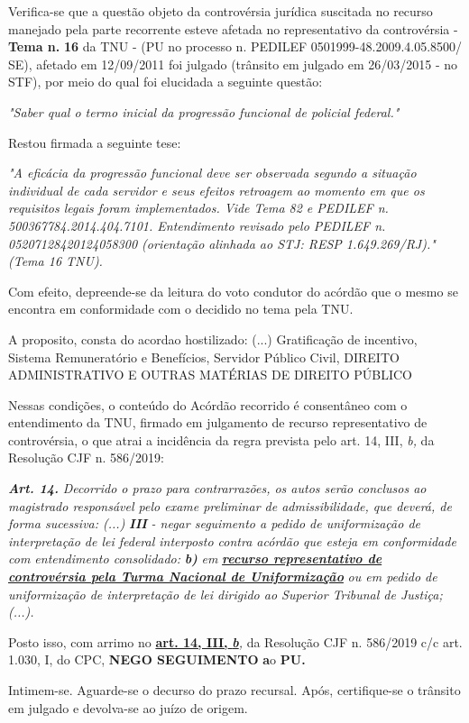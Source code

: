 \documentclass[12pt]{article}
\begin{document}
\justifying
\noindent Verifica-se que a questão objeto da controvérsia jurídica suscitada no recurso manejado pela parte recorrente esteve afetada no representativo da controvérsia - \textbf{Tema n. }\textbf{16} da TNU - (PU no processo n. PEDILEF 0501999-48.2009.4.05.8500/ SE),  afetado em 12/09/2011 foi julgado (trânsito em julgado em 26/03/2015 - no STF), por meio do qual foi elucidada a seguinte questão:

\noindent \textit{"Saber qual o termo inicial da progressão funcional de policial federal."}

\noindent Restou firmada a seguinte tese:

\noindent \textit{"A eficácia da progressão funcional deve ser observada segundo a situação individual de cada servidor e seus efeitos retroagem ao momento em que os requisitos legais foram implementados. Vide Tema 82 e PEDILEF n. 500367784.2014.404.7101. Entendimento revisado pelo PEDILEF n. 05207128420124058300 (orientação alinhada ao STJ: RESP 1.649.269/RJ)." (Tema 16 TNU).}

\noindent Com efeito, depreende-se da leitura do voto condutor do acórdão que o mesmo se encontra em conformidade com o decidido no  tema pela TNU.

\noindent A proposito, consta do acordao hostilizado: (...) Gratificação de incentivo, Sistema Remuneratório e Benefícios, Servidor Público Civil, DIREITO ADMINISTRATIVO E OUTRAS MATÉRIAS DE DIREITO PÚBLICO

\noindent Nessas condições, o conteúdo do Acórdão recorrido é consentâneo com o entendimento da TNU, firmado em julgamento de recurso representativo de controvérsia, o que atrai a incidência da regra prevista pelo art. 14, III, \textit{b,} da Resolução CJF n. 586/2019:

\noindent \textit{\textbf{Art. 14.}}\textit{ Decorrido o prazo para contrarrazões, os autos serão conclusos ao magistrado responsável pelo exame preliminar de admissibilidade, que deverá, de forma sucessiva: (...) }\textit{\textbf{III }}\textit{- negar seguimento a pedido de uniformização de interpretação de lei federal interposto contra acórdão que esteja em conformidade com entendimento consolidado: }\textit{\textbf{b)}}\textit{ em }\uline{\textit{\textbf{recurso representativo de controvérsia pela Turma Nacional de Uniformização}}}\textit{ ou em pedido de uniformização de interpretação de lei dirigido ao Superior Tribunal de Justiça;(...).}

\noindent Posto isso, com arrimo no \uline{\textbf{art. 14, III, }}\uline{\textit{\textbf{b}}}\textit{,} da Resolução CJF n. 586/2019 c/c art. 1.030, I, do CPC, \textbf{NEGO SEGUIMENTO }\textbf{a}o\textbf{ PU}\textbf{.}

\noindent Intimem-se. Aguarde-se o decurso do prazo recursal. Após, certifique-se o trânsito em julgado e devolva-se ao juízo de origem.
\end{document}
